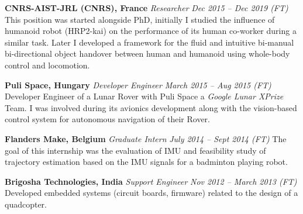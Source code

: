 \documentclass[10pt, oneside]{article} %
\begin{document}
\begin{paracol}{2}
\workposition
{\textbf{CNRS-AIST-JRL (CNRS), France}}
{\textit{Researcher} \hfill \footnotesize{\textit{Dec 2015 -- Dec 2019 \hspace{10pt}(FT)}}}
{This position was started alongside PhD, initially I studied the influence of humanoid robot (HRP2-kai) on the performance of its human co-worker during a similar task. Later I developed a framework for the fluid and intuitive bi-manual bi-directional object handover between human and humanoid using whole-body control and locomotion.}

\workposition
{\textbf{Puli Space, Hungary}}
{\textit{Developer Engineer} \hfill \footnotesize{\textit{March 2015 -- Aug 2015 \hspace{10pt}(FT)}}}
{Developer Engineer of a Lunar Rover with Puli Space a \textit{Google Lunar XPrize} Team. I was involved during its avionics development along with the vision-based control system for autonomous navigation of their Rover.}

\workposition
{\textbf{Flanders Make, Belgium}}
{\textit{Graduate Intern} \hfill \footnotesize{\textit{July 2014 -- Sept 2014 \hspace{10pt}(FT)}}}
{The goal of this internship was the evaluation of IMU and feasibility study of trajectory estimation based on the IMU signals for a badminton playing robot.}

\workposition
{\textbf{Brigosha Technologies, India}}
{\textit{Support Engineer} \hfill \footnotesize{\textit{Nov 2012 -- March 2013 \hspace{10pt}(FT)}}}
{Developed embedded systems (circuit boards, firmware) related to the design of a quadcopter.}\newline








\end{paracol}
\end{document}
